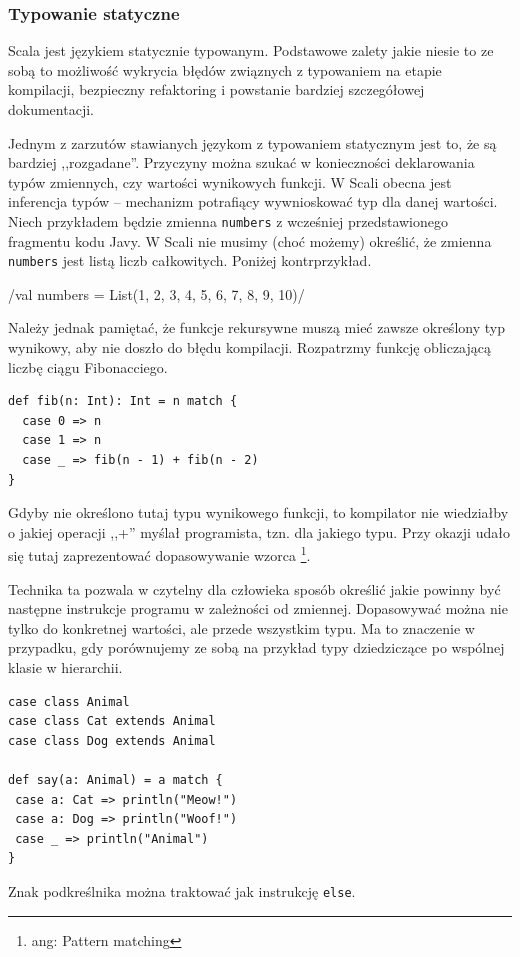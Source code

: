 \documentclass[brudnopis]{xmgr}
\begin{document}
\subsubsection{Typowanie statyczne}

Scala jest językiem statycznie typowanym. Podstawowe zalety jakie niesie to ze sobą to możliwość wykrycia błędów związnych z typowaniem na etapie kompilacji, bezpieczny refaktoring i powstanie bardziej szczegółowej dokumentacji. 

Jednym z zarzutów stawianych językom z typowaniem statycznym jest to, że są bardziej ,,rozgadane''. Przyczyny można szukać w konieczności deklarowania typów zmiennych, czy wartości wynikowych funkcji. W Scali obecna jest inferencja typów -- mechanizm potrafiący wywnioskować typ dla danej wartości. Niech przykładem będzie zmienna \texttt{numbers} z wcześniej przedstawionego fragmentu kodu Javy. W Scali nie musimy (choć możemy) określić, że zmienna \texttt{numbers} jest listą liczb całkowitych. Poniżej kontrprzykład.

/val numbers = List(1, 2, 3, 4, 5, 6, 7, 8, 9, 10)/

Należy jednak pamiętać, że funkcje rekursywne muszą mieć zawsze określony typ wynikowy, aby nie doszło do błędu kompilacji. Rozpatrzmy funkcję obliczającą liczbę ciągu Fibonacciego.

\begin{verbatim}
def fib(n: Int): Int = n match {
  case 0 => n
  case 1 => n
  case _ => fib(n - 1) + fib(n - 2)
}
\end{verbatim}

Gdyby nie określono tutaj typu wynikowego funkcji, to kompilator nie wiedziałby o jakiej operacji ,,+'' myślał programista, tzn. dla jakiego typu. Przy okazji udało się tutaj zaprezentować dopasowywanie wzorca \footnote{ang: Pattern matching}.

Technika ta pozwala w czytelny dla człowieka sposób określić jakie powinny być następne instrukcje programu w zależności od zmiennej. Dopasowywać można nie tylko do konkretnej wartości, ale przede wszystkim typu. Ma to znaczenie w przypadku, gdy porównujemy ze sobą na przykład typy dziedziczące po wspólnej klasie w hierarchii.

\begin{verbatim}
case class Animal
case class Cat extends Animal
case class Dog extends Animal

def say(a: Animal) = a match {
 case a: Cat => println("Meow!")
 case a: Dog => println("Woof!")
 case _ => println("Animal")
}
\end{verbatim}
\label{patternMatching:example}
Znak podkreślnika można traktować jak instrukcję \texttt{else}.
\end{document}
